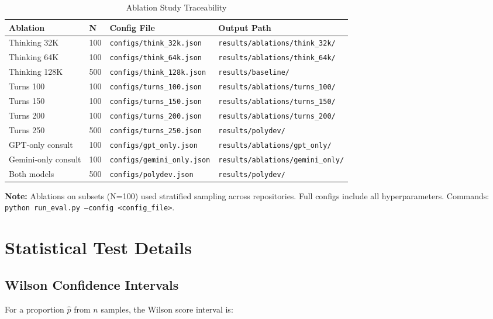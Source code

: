 \documentclass[11pt,a4paper]{article}
\begin{document}
\begin{table}[h]
\centering
\caption{Ablation Study Traceability}
\label{tab:ablation_artifacts}
\begin{tabular}{llll}
\toprule
\textbf{Ablation} & \textbf{N} & \textbf{Config File} & \textbf{Output Path} \\
\midrule
Thinking 32K & 100 & \texttt{configs/think\_32k.json} & \texttt{results/ablations/think\_32k/} \\
Thinking 64K & 100 & \texttt{configs/think\_64k.json} & \texttt{results/ablations/think\_64k/} \\
Thinking 128K & 500 & \texttt{configs/think\_128k.json} & \texttt{results/baseline/} \\
Turns 100 & 100 & \texttt{configs/turns\_100.json} & \texttt{results/ablations/turns\_100/} \\
Turns 150 & 100 & \texttt{configs/turns\_150.json} & \texttt{results/ablations/turns\_150/} \\
Turns 200 & 100 & \texttt{configs/turns\_200.json} & \texttt{results/ablations/turns\_200/} \\
Turns 250 & 500 & \texttt{configs/turns\_250.json} & \texttt{results/polydev/} \\
GPT-only consult & 100 & \texttt{configs/gpt\_only.json} & \texttt{results/ablations/gpt\_only/} \\
Gemini-only consult & 100 & \texttt{configs/gemini\_only.json} & \texttt{results/ablations/gemini\_only/} \\
Both models & 500 & \texttt{configs/polydev.json} & \texttt{results/polydev/} \\
\bottomrule
\end{tabular}
\end{table}

\textbf{Note:} Ablations on subsets (N=100) used stratified sampling across repositories. Full configs include all hyperparameters. Commands: \texttt{python run\_eval.py --config <config\_file>}.

\section{Statistical Test Details}

\subsection{Wilson Confidence Intervals}

For a proportion $\hat{p}$ from $n$ samples, the Wilson score interval is:
\end{document}
